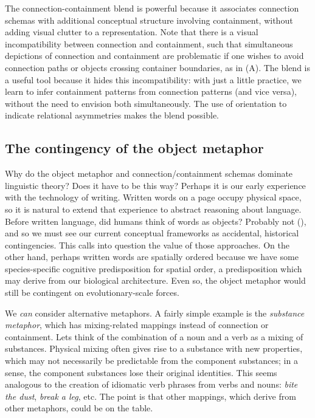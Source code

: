   The connection-containment blend is powerful because it associates connection schemas with additional conceptual structure involving containment, without adding visual clutter to a representation. Note that there is a visual incompatibility between connection and containment, such that simultaneous depictions of connection and containment are problematic if one wishes to avoid connection paths or objects crossing container boundaries, as in (A). The blend is a useful tool because it hides this incompatibility: with just a little practice, we learn to infer containment patterns from connection patterns (and vice versa), without the need to envision both simultaneously. The use of orientation to indicate relational asymmetries makes the blend possible.

\subsection{{\textbf{The contingency of the object metaphor}}}

Why do the object metaphor and connection/containment schemas dominate linguistic theory? Does it have to be this way? Perhaps it is our early experience with the technology of writing. Written words on a page occupy physical space, so it is natural to extend that experience to abstract reasoning about language. Before written language, did humans think of words as objects? Probably not (\citealt{Linell19882005,Ong2013}), and so we must see our current conceptual frameworks as accidental, historical contingencies. This calls into question the value of those approaches. On the other hand, perhaps written words are spatially ordered because we have some species-specific cognitive predisposition for spatial order, a predisposition which may derive from our biological architecture. Even so, the object metaphor would still be contingent on evolutionary-scale forces. 

  We \textit{can} consider alternative metaphors. A fairly simple example is the \textit{substance metaphor}, which has mixing-related mappings instead of connection or containment. Lets think of the combination of a noun and a verb as a mixing of substances. Physical mixing often gives rise to a substance with new properties, which may not necessarily be predictable from the component substances; in a sense, the component substances lose their original identities. This seems analogous to the creation of idiomatic verb phrases from verbs and nouns: \textit{bite the dust}, \textit{break a leg}, etc. The point is that other mappings, which derive from other metaphors, could be on the table.

